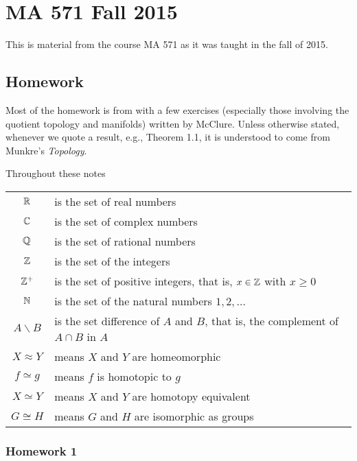 \section{MA 571 Fall 2015}
This is material from the course MA 571 as it was taught in the fall of
2015.%
\bigskip
\subsection{Homework}
 Most of the homework is from \cite{munkres} with a few exercises
(especially those involving the quotient topology and manifolds) written by
McClure. Unless otherwise stated, whenever we quote a result, e.g., Theorem
1.1, it is understood to come from Munkre's \emph{Topology}.

Throughout these notes

\begin{tabular}{cl}
  $\mathbb{R}$ & is the set of real numbers\\
  $\mathbb{C}$ & is the set of complex numbers\\
  $\mathbb{Q}$ & is the set of rational numbers\\
  $\mathbb{Z}$ & is the set of the integers\\
  $\mathbb{Z}^+$ & is the set of positive integers, that is, $x\in\mathbb{Z}$ with
             $x\geq 0$\\
  $\mathbb{N}$ & is the set of the natural numbers $1,2,\ldots$\\
  $A\smallsetminus B$ & is the set difference of $A$ and $B$, that is, the
                        complement of $A\cap B$ in $A$\\
  $X\approx Y$& means $X$ and $Y$ are homeomorphic\\
  $f\simeq g$& means $f$ is homotopic to $g$\\
  $X\simeq Y$&means $X$ and $Y$ are homotopy equivalent\\
  $G\cong H$& means $G$ and $H$ are isomorphic as groups
\end{tabular}

\newpage
\subsubsection{Homework 1}
\setcounter{exercise}{0}


